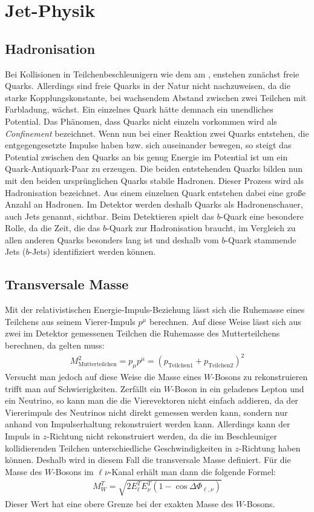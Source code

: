 \section{Jet-Physik}
\subsection{Hadronisation}
Bei Kollisionen in Teilchenbeschleunigern wie dem \lhc am \cern, enstehen zunächst freie Quarks. Allerdings sind freie Quarks in der Natur nicht nachzuweisen, da die starke Kopplungskonstante, bei wachsendem Abstand zwischen zwei Teilchen mit Farbladung, wächst. Ein einzelnes Quark hätte demnach ein unendliches Potential. Das Phänomen, dass Quarks nicht einzeln vorkommen wird als \emph{Confinement} bezeichnet. Wenn nun bei einer Reaktion zwei Quarks entstehen, die entgegengesetzte Impulse haben bzw. sich auseinander bewegen, so steigt das Potential zwischen den Quarks an bis genug Energie im Potential ist um ein Quark-Antiquark-Paar zu erzeugen. Die beiden entstehenden Quarks bilden nun mit den beiden ursprünglichen Quarks stabile Hadronen. Dieser Prozess wird als Hadronisation bezeichnet. Aus einem einzelnen Quark entstehen dabei eine große Anzahl an Hadronen. Im Detektor werden deshalb Quarks als Hadronenschauer, auch Jets genannt, sichtbar. Beim Detektieren spielt das $b$-Quark eine besondere Rolle, da die Zeit, die das $b$-Quark zur Hadronisation braucht, im Vergleich zu allen anderen Quarks besonders lang ist und deshalb vom $b$-Quark stammende Jets ($b$-Jets) identifiziert werden können.
\subsection{Transversale Masse}
Mit der relativistischen Energie-Impuls-Beziehung lässt sich die Ruhemasse eines Teilchens aus seinem Vierer-Impuls $p^\mu$ berechnen. Auf diese Weise lässt sich aus zwei im Detektor gemessenen Teilchen die Ruhemasse des Mutterteilchens berechnen, da gelten muss:
\begin{align*}
M_{\text{Mutterteilchen}}^2 = p_\mu p^\mu = (p_{\text{Teilchen} 1}+p_{\text{Teilchen} 2})^2
\end{align*}
Versucht man jedoch auf diese Weise die Masse eines $W$-Bosons zu rekonstruieren trifft man auf Schwierigkeiten. Zerfällt ein $W$-Boson in ein geladenes Lepton und ein Neutrino, so kann man die die Vierevektoren nicht einfach addieren, da der Viererimpuls des Neutrinos nicht direkt gemessen werden kann, sondern nur anhand von Impulserhaltung rekonstruiert werden kann. Allerdings kann der Impuls in $z$-Richtung nicht rekonstruiert werden, da die im Beschleuniger kollidierenden Teilchen unterschiedliche Geschwindigkeiten in $z$-Richtung haben können. Deshalb wird in diesem Fall die transversale Masse definiert. Für die Masse des $W$-Bosons im $\ell \nu$-Kanal erhält man dann die folgende Formel:
\begin{align*}
M_W^T = \sqrt{2E_{\ell}^TE_\nu^T\left(1-\cos \Delta\Phi_{\ell,\nu}\right)}
\end{align*}
Dieser Wert hat eine obere Grenze bei der exakten Masse des $W$-Bosons.

